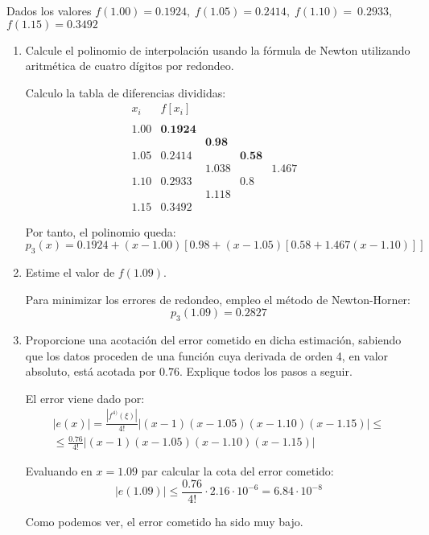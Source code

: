 \begin{ejercicio}
    Dados los valores $f(1.00) = 0.1924,\;f(1.05) = 0.2414,\;f(1.10) =~0.2933,$ $f(1.15) = 0.3492$
    \begin{enumerate}
        \item Calcule el polinomio de interpolación usando la fórmula de Newton utilizando aritmética de cuatro dígitos por redondeo.

        Calculo la tabla de diferencias divididas:
        \begin{equation*}
            \begin{array}{c|cccccc}
                x_i & f[x_i] \\
                \\
                1.00 & \textbf{0.1924} \\
                && \textbf{0.98}\\
                1.05 & 0.2414 && \textbf{0.58}\\
                && 1.038&&\mathbf{1.467}\\
                1.10 & 0.2933 && 0.8 &&\\
                && 1.118\\
                1.15 & 0.3492
            \end{array}
        \end{equation*}

        Por tanto, el polinomio queda:
        \begin{equation*}
            p_3(x) = 0.1924 + (x-1.00)[0.98+(x-1.05)[0.58+1.467(x-1.10)]]
        \end{equation*}
        
        \item Estime el valor de $f(1.09)$.

        Para minimizar los errores de redondeo, empleo el método de Newton-Horner:
        \begin{equation*}
            p_3(1.09) = 0.2827
        \end{equation*}
        \item Proporcione una acotación del error cometido en dicha estimación, sabiendo que los datos proceden de una función cuya derivada de orden 4, en valor absoluto, está acotada por $0.76$. Explique todos los pasos a seguir.

        El error viene dado por:
        \begin{multline*}
            |e(x)| = \frac{|f^{4)}(\xi)|}{4!}|(x-1)(x-1.05)(x-1.10)(x-1.15)|
            \leq \\ \leq
            \frac{0.76}{4!}|(x-1)(x-1.05)(x-1.10)(x-1.15)|
        \end{multline*}

        Evaluando en $x=1.09$ par calcular la cota del error cometido:
        \begin{equation*}
            |e(1.09)| \leq \frac{0.76}{4!}\cdot 2.16\cdot 10^{-6} = 6.84\cdot 10^{-8}
        \end{equation*}

        Como podemos ver, el error cometido ha sido muy bajo.        
    \end{enumerate}
\end{ejercicio}

